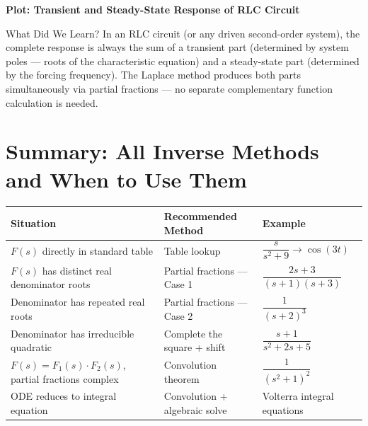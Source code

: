 \documentclass[12pt,a4paper]{article}
\begin{document}
\medskip
\textbf{Plot: Transient and Steady-State Response of RLC Circuit}

\begin{center}
\end{center}

\begin{learnbox}{What Did We Learn?}
In an RLC circuit (or any driven second-order system), the complete response is always
the sum of a transient part (determined by system poles --- roots of the characteristic
equation) and a steady-state part (determined by the forcing frequency). The Laplace
method produces both parts simultaneously via partial fractions --- no separate
complementary function calculation is needed.
\end{learnbox}

\section{Summary: All Inverse Methods and When to Use Them}

\begin{center}
\begin{tabular}{@{}p{4.5cm}p{5cm}p{4.5cm}@{}}
\toprule
\textbf{Situation} & \textbf{Recommended Method} & \textbf{Example} \\
\midrule
$F(s)$ directly in standard table &
Table lookup &
$\dfrac{s}{s^2+9} \to \cos(3t)$ \\
\midrule
$F(s)$ has distinct real denominator roots &
Partial fractions --- Case 1 &
$\dfrac{2s+3}{(s+1)(s+3)}$ \\
\midrule
Denominator has repeated real roots &
Partial fractions --- Case 2 &
$\dfrac{1}{(s+2)^3}$ \\
\midrule
Denominator has irreducible quadratic &
Complete the square + shift &
$\dfrac{s+1}{s^2+2s+5}$ \\
\midrule
$F(s) = F_1(s)\cdot F_2(s)$, partial fractions complex &
Convolution theorem &
$\dfrac{1}{(s^2+1)^2}$ \\
\midrule
ODE reduces to integral equation &
Convolution + algebraic solve &
Volterra integral equations \\
\bottomrule
\end{tabular}
\end{center}
\end{document}
